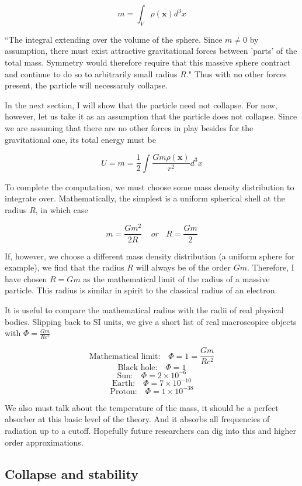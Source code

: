 \documentclass {article}
\renewcommand\vec{\mathbf}
\begin{document}
$$ m = \int_V \rho(\vec x) d^3x$$

``The integral extending over the volume of the sphere. Since $m \neq 0$ by assumption, there must exist attractive gravitational forces between 'parts' of the total mass. Symmetry would therefore require that this massive sphere contract and continue to do so to arbitrarily small radius $R$." Thus with no other forces present, the particle will necessaruly collapse.

In the next section, I will show that the particle need not collapse. For now, however, let us take it as an assumption that the particle does not collapse. Since we are assuming that there are no other forces in play besides for the gravitational one, its total energy must be

$$U = m = \frac 1 2 \int \frac {Gm \rho(\vec x)} {r^2} d^3x$$

To complete the computation, we must choose some mass density distribution to integrate over. Mathematically, the simplest is a uniform spherical shell at the radius $R$, in which case

$$m = \frac {Gm^2} { 2R} ~~~~~ or  ~~~~ R = \frac {Gm} 2 $$

If, however, we choose a different mass density distribution (a uniform sphere for example), we find that the radius $R$ will always be of the order $Gm$. Therefore, I have chosen $R = Gm$ as the mathematical limit of the radius of a massive particle. This radius is similar in spirit to the classical radius of an electron.

It is useful to compare the mathematical radius with the radii of real physical bodies. Slipping back to SI units, we give a short list of real macroscopice objects with $\Phi = \frac {Gm}{Rc^2}$

$$\text{Mathematical limit:  } ~~~ \Phi = 1 = \frac {Gm}{Rc^2}$$
$$\text{Black hole:  } ~~~ \Phi = 1$$
$$\text{Sun:  } ~~~ \Phi = 2 \times 10^{-6}$$
$$\text{Earth:  } ~~~ \Phi = 7 \times 10^{-10}$$
$$\text{Proton:  } ~~~ \Phi = 1\times 10^{-38}$$

We also must talk about the temperature of the mass, it should be a perfect absorber at this basic level of the theory. And it absorbs all frequencies of radiation up to a cutoff.  Hopefully future researchers can dig into this and higher order approximations.

\newpage
\subsection{Collapse and stability}
\end{document}
